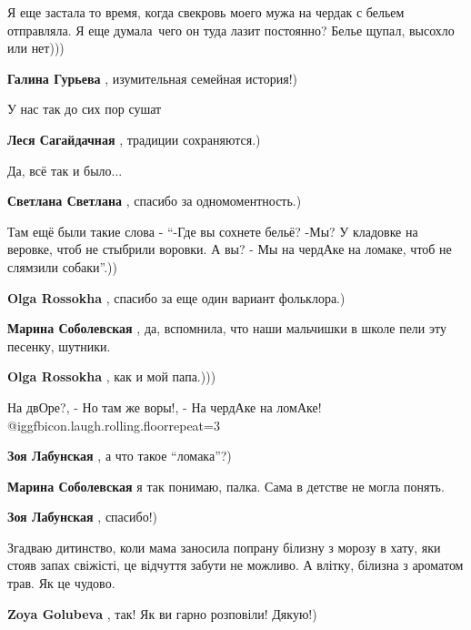 \begin{itemize}
\begin{itemize}

Я еще застала то время, когда свекровь моего мужа на чердак с бельем
отправляла. Я еще думала~чего он туда лазит постоянно? Белье щупал, высохло или
нет)))


\textbf{Галина Гурьева} , изумительная семейная история!)
\end{itemize} %

У нас так до сих пор сушат

\textbf{Леся Сагайдачная} , традиции сохраняются.)

Да, всё так и было...

\textbf{Светлана Светлана} , спасибо за одномоментность.)


Там ещё были такие слова - \enquote{-Где вы сохнете бельё? -Мы? У кладовке на веровке,
чтоб не стыбрили воровки. А вы? - Мы на чердАке на ломаке, чтоб не слямзили
собаки}.))

\begin{itemize} %
\textbf{Olga Rossokha} , спасибо за еще один вариант фольклора.)

\textbf{Марина Соболевская} , да, вспомнила, что наши мальчишки в школе пели эту песенку, шутники.

\textbf{Olga Rossokha} , как и мой папа.)))
\end{itemize} %

На двОре?, - Но там же воры!, - На чердАке на ломАке!  @igg{fbicon.laugh.rolling.floor}{repeat=3} 

\begin{itemize} %
\textbf{Зоя Лабунская} , а что такое \enquote{ломака}?)

\textbf{Марина Соболевская} я так понимаю, палка. Сама в детстве не могла понять.

\textbf{Зоя Лабунская} , спасибо!)
\end{itemize} %


Згадваю дитинство, коли мама заносила попрану білизну з морозу в хату, яки
стояв запах свіжісті, це відчуття забути не можливо. А влітку, білизна з
ароматом трав. Як це чудово.


\textbf{Zoya Golubeva} , так! Як ви гарно розповіли! Дякую!)


\end{itemize}
